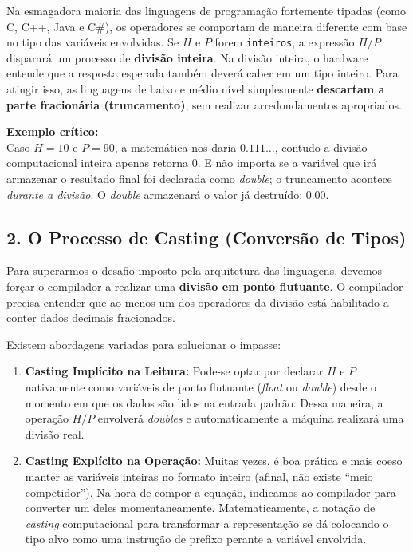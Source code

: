 \documentclass[11pt]{article}
\begin{document}
\begin{warnbox}
Na esmagadora maioria das linguagens de programação fortemente tipadas (como C, C++, Java e C\#), os operadores se comportam de maneira diferente com base no tipo das variáveis envolvidas.
Se $H$ e $P$ forem \texttt{inteiros}, a expressão $H / P$ disparará um processo de \textbf{divisão inteira}.
Na divisão inteira, o hardware entende que a resposta esperada também deverá caber em um tipo inteiro. Para atingir isso, as linguagens de baixo e médio nível simplesmente \textbf{descartam a parte fracionária (truncamento)}, sem realizar arredondamentos apropriados.

\textbf{Exemplo crítico:} \\
Caso $H = 10$ e $P = 90$, a matemática nos daria $0.111\dots$, contudo a divisão computacional inteira apenas retorna $0$. E não importa se a variável que irá armazenar o resultado final foi declarada como \textit{double}; o truncamento acontece \textit{durante a divisão}. O \textit{double} armazenará o valor já destruído: $0.00$.
\end{warnbox}

\subsection*{2. O Processo de Casting (Conversão de Tipos)}

Para superarmos o desafio imposto pela arquitetura das linguagens, devemos forçar o compilador a realizar uma \textbf{divisão em ponto flutuante}. O compilador precisa entender que ao menos um dos operadores da divisão está habilitado a conter dados decimais fracionados.

Existem abordagens variadas para solucionar o impasse:
\begin{enumerate}
    \item \textbf{Casting Implícito na Leitura:} Pode-se optar por declarar $H$ e $P$ nativamente como variáveis de ponto flutuante (\textit{float} ou \textit{double}) desde o momento em que os dados são lidos na entrada padrão. Dessa maneira, a operação $H / P$ envolverá \textit{doubles} e automaticamente a máquina realizará uma divisão real.
    \item \textbf{Casting Explícito na Operação:} Muitas vezes, é boa prática e mais coeso manter as variáveis inteiras no formato inteiro (afinal, não existe ``meio competidor''). Na hora de compor a equação, indicamos ao compilador para converter um deles momentaneamente. Matematicamente, a notação de \textit{casting} computacional para transformar a representação se dá colocando o tipo alvo como uma instrução de prefixo perante a variável envolvida.
\end{enumerate}
\end{document}
